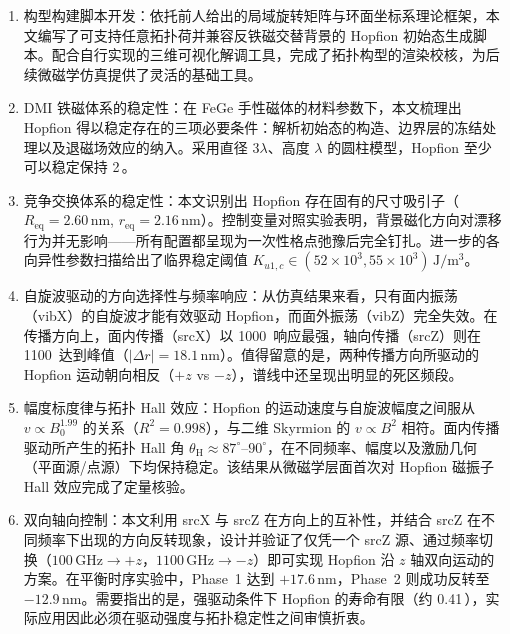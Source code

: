 \documentclass{article}
\begin{document}
\begin{enumerate}[label=(\arabic*)]
  \item 构型构建脚本开发：依托前人给出的局域旋转矩阵与环面坐标系理论框架，本文编写了可支持任意拓扑荷并兼容反铁磁交替背景的 Hopfion 初始态生成脚本。配合自行实现的三维可视化解调工具，完成了拓扑构型的渲染校核，为后续微磁学仿真提供了灵活的基础工具。

  \item DMI 铁磁体系的稳定性：在 FeGe 手性磁体的材料参数下，本文梳理出 Hopfion 得以稳定存在的三项必要条件：解析初始态的构造、边界层的冻结处理以及退磁场效应的纳入。采用直径 $3\lambda$、高度 $\lambda$ 的圆柱模型，Hopfion 至少可以稳定保持 2\,。

  \item 竞争交换体系的稳定性：本文识别出 Hopfion 存在固有的尺寸吸引子（$R_{\text{eq}} = 2.60\,\mathrm{nm}$, $r_{\text{eq}} = 2.16\,\mathrm{nm}$）。控制变量对照实验表明，背景磁化方向对漂移行为并无影响——所有配置都呈现为一次性格点弛豫后完全钉扎。进一步的各向异性参数扫描给出了临界稳定阈值 $K_{u1,c} \in (52\times10^{3}, 55\times10^{3}) \, \mathrm{J/m^3}$。

  \item 自旋波驱动的方向选择性与频率响应：从仿真结果来看，只有面内振荡（vibX）的自旋波才能有效驱动 Hopfion，而面外振荡（vibZ）完全失效。在传播方向上，面内传播（srcX）以 1000\, 响应最强，轴向传播（srcZ）则在 1100\, 达到峰值（$|\Delta r| = 18.1\,\mathrm{nm}$）。值得留意的是，两种传播方向所驱动的 Hopfion 运动朝向相反（$+z$ vs $-z$），谱线中还呈现出明显的死区频段。

  \item 幅度标度律与拓扑 Hall 效应：Hopfion 的运动速度与自旋波幅度之间服从 $v \propto B_0^{1.99}$ 的关系（$R^2 = 0.998$），与二维 Skyrmion 的 $v \propto B^2$ 相符。面内传播驱动所产生的拓扑 Hall 角 $\theta_{\text{H}} \approx 87^{\circ}$--$90^{\circ}$，在不同频率、幅度以及激励几何（平面源/点源）下均保持稳定。该结果从微磁学层面首次对 Hopfion 磁振子 Hall 效应完成了定量核验。

  \item 双向轴向控制：本文利用 srcX 与 srcZ 在方向上的互补性，并结合 srcZ 在不同频率下出现的方向反转现象，设计并验证了仅凭一个 srcZ 源、通过频率切换（$100\,\mathrm{GHz} \to +z$，$1100\,\mathrm{GHz} \to -z$）即可实现 Hopfion 沿 $z$ 轴双向运动的方案。在平衡时序实验中，Phase~1 达到 $+17.6\,\mathrm{nm}$，Phase~2 则成功反转至 $-12.9\,\mathrm{nm}$。需要指出的是，强驱动条件下 Hopfion 的寿命有限（约 0.41\,），实际应用因此必须在驱动强度与拓扑稳定性之间审慎折衷。
\end{enumerate}
\end{document}

